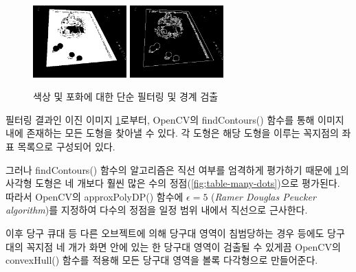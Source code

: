 \documentclass[10pt]{oblivoir}
\begin{document}
\begin{figure}[ht]
    \centering
    \includegraphics[width=3.6cm]{img/billiards-table-filter.png}
    \includegraphics[width=3.6cm]{img/billiards-table-edge.png}
    \caption{색상 및 포화에 대한 단순 필터링 및 경계 검출}
    \label{fig;table-filtered}
\end{figure}

필터링 결과인 이진 이미지 \cref{fig;table-filtered}로부터, OpenCV의 findContours() 함수를 통해 이미지 내에 존재하는 모든 도형을 찾아낼 수 있다. 각 도형은 해당 도형을 이루는 꼭지점의 좌표 목록으로 구성되어 있다. 

그러나 findContours() 함수의 알고리즘은 직선 여부를 엄격하게 평가하기 때문에 \cref{fig;table-filtered}의 사각형 도형은 네 개보다 훨씬 많은 수의 정점(\cref{fig;table-many-dots})으로 평가된다. 따라서 OpenCV의 approxPolyDP() 함수에 $\epsilon = 5$ (\textit{Ramer Douglas Peucker algorithm})를 지정하여 다수의 정점을 일정 범위 내에서 직선으로 근사한다.

이후 당구 큐대 등 다른 오브젝트에 의해 당구대 영역이 침범당하는 경우 등에도 당구대의 꼭지점 네 개가 화면 안에 있는 한 당구대 영역이 검출될 수 있게끔 OpenCV의 convexHull() 함수를 적용해 모든 당구대 영역을 볼록 다각형으로 만들어준다.
\end{document}
